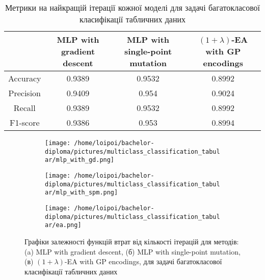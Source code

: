 \begin{table}[ht]
	\centering
	\begin{adjustbox}{max width=\textwidth}
		\begin{tabular}{|c|c|c|c|}
			\hline 
			& MLP with gradient descent & MLP with single-point mutation & $(1+\lambda)$-EA with GP encodings \\
			\hline 
			Accuracy & 0.9389 & 0.9532 & 0.8992 \\
			\hline 
			Precision & 0.9409 & 0.954 & 0.9024 \\
			\hline
			Recall & 0.9389 & 0.9532 & 0.8992 \\
			\hline
			F1-score & 0.9386 & 0.953 & 0.8994 \\
			\hline
		\end{tabular}
	\end{adjustbox}
	\caption{Метрики на найкращій ітерації кожної моделі для задачі багатокласової класифікації табличних даних}
	\label{metrics_mc_td_results}
\end{table}

\begin{figure}[ht]
	\centering
	\begin{subfigure}[b]{0.32\textwidth}    
		\texttt{[image: /home/loipoi/bachelor-diploma/pictures/multiclass\_classification\_tabular/mlp\_with\_gd.png]}
		\caption{}
	\end{subfigure}	
	\begin{subfigure}[b]{0.32\textwidth}
		\texttt{[image: /home/loipoi/bachelor-diploma/pictures/multiclass\_classification\_tabular/mlp\_with\_spm.png]}
		\caption{}
	\end{subfigure}	
	\begin{subfigure}[b]{0.32\textwidth}
		\texttt{[image: /home/loipoi/bachelor-diploma/pictures/multiclass\_classification\_tabular/ea.png]}
		\caption{}
	\end{subfigure}
	
	\caption{Графіки залежності функцій втрат від кількості ітерацій для методів: (a) MLP with gradient descent, (б) MLP with single-point mutation, (в) $(1+\lambda)$-EA with GP encodings, для задачі багатокласової класифікації табличних даних}
	\label{fig_losses_mc_td}
\end{figure}

